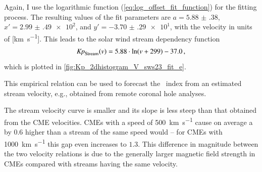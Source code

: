 Again, I use the logarithmic function (\ref{eq:log_offset_fit_function}) for the fitting process. The resulting values of the fit parameters are \mbox{$a = \num{5.88(38)}$}, $x' = \num{2.99(49)e2}$, and $y' = \num{-3.70(29)e1}$, with the velocity in units of [\si{\km\per\s}].
This leads to the solar wind stream dependency function
\begin{align}
	\text{\textit{Kp}}_\text{Stream}(v) = 5.88 \cdot \ln(v + 299) - 37.0	\,,	\label{eq:kpvsv_stream_dependency_function}
\end{align}
which is plotted in \autoref{fig:Kp_2dhistogram_V_sws23_fit_e}.
\begin{figure}[htb]
\end{figure}
This empirical relation can be used to forecast the \Kp~index from an estimated stream velocity, e.g., obtained from remote coronal hole analyses.

The stream velocity curve is smaller and its slope is less steep than that obtained from the CME velocities. CMEs with a speed of \SI{500}{\km\per\s} cause on average a by $0.6$ higher \Kp{} than a stream of the same speed would -- for CMEs with \SI{1000}{\km\per\s} this gap even increases to $1.3$. This difference in \Kp{} magnitude between the two velocity relations is due to the generally larger magnetic field strength in CMEs compared with streams having the same velocity.

